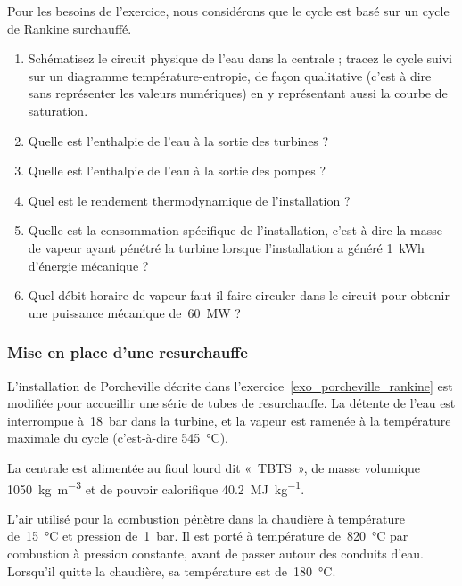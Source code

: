 	Pour les besoins de l’exercice, nous considérons que le cycle est basé sur un cycle de Rankine surchauffé.
	
	\begin{enumerate}
		\item Schématisez le circuit physique de l’eau dans la centrale ; tracez le cycle suivi sur un diagramme température-entropie, de façon qualitative (c’est à dire sans représenter les valeurs numériques) en y représentant aussi la courbe de saturation.
		\item Quelle est l’enthalpie de l’eau à la sortie des turbines ?
		\item Quelle est l’enthalpie de l’eau à la sortie des pompes ?
		\item	Quel est le rendement thermodynamique de l’installation ?
		\item Quelle est la consommation spécifique de l’installation, c’est-à-dire la masse de vapeur ayant pénétré la turbine lorsque l’installation a généré \SI{1}{\kWh} d’énergie mécanique ?
		\item Quel débit horaire de vapeur faut-il faire circuler dans le circuit pour obtenir une puissance mécanique de~\SI{60}{\mega\watt} ?
	\end{enumerate}


\subsubsection{Mise en place d’une resurchauffe}
\label{exo_porcheville_resurchauffe}

	L’installation de Porcheville décrite dans l’exercice~\ref{exo_porcheville_rankine} est modifiée pour accueillir une série de tubes de resurchauffe. La détente de l’eau est interrompue à~\SI{18}{\bar} dans la turbine, et la vapeur est ramenée à la température maximale du cycle (c’est-à-dire \SI{545}{\degreeCelsius}).
	
	La centrale est alimentée au fioul lourd dit «~TBTS~», de masse volumique \SI{1050}{\kilogram\per\metre\cubed} et de pouvoir calorifique \SI{40,2}{\mega\joule\per\kilogram}.
	
	L’air utilisé pour la combustion pénètre dans la chaudière à température de~\SI{15}{\degreeCelsius} et pression de~\SI{1}{\bar}. Il est porté à température de~\SI{820}{\degreeCelsius} par combustion à pression constante, avant de passer autour des conduits d’eau. Lorsqu’il quitte la chaudière, sa température est de~\SI{180}{\degreeCelsius}.
	
